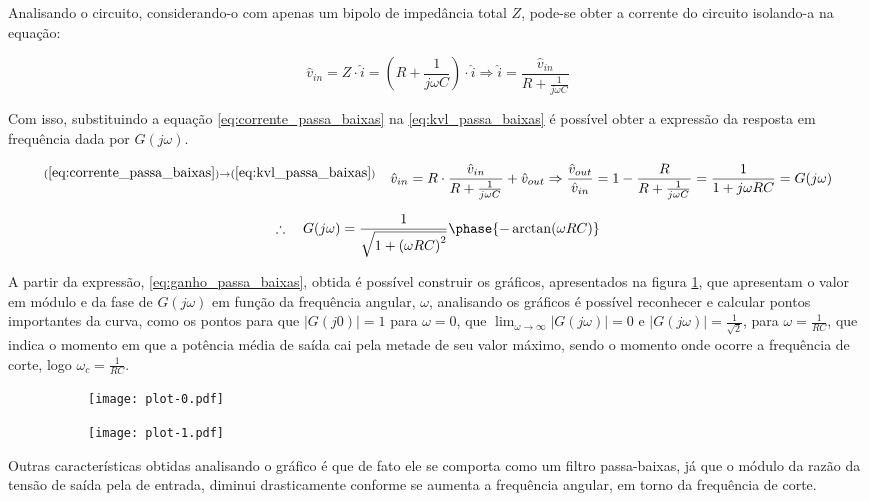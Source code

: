   Analisando o circuito, considerando-o com apenas um bipolo de impedância total $Z$, pode-se obter a corrente do circuito isolando-a na equação:

  \begin{equation}
    \hat{v}_{in} = Z \cdot \hat{i} = \left( R + \frac{1}{j \omega C} \right) \cdot \hat{i} \Rightarrow \hat{i} = \frac{\hat{v}_{in}}{R + \frac{1}{j \omega C}}
    \label{eq:corrente_passa_baixas}
  \end{equation}

  Com isso, substituindo a equação \ref{eq:corrente_passa_baixas} na \ref{eq:kvl_passa_baixas} é possível obter a expressão da resposta em frequência dada por $G(j \omega)$.

  \begin{equation*}
    \sp{(\ref{eq:corrente_passa_baixas}) \rightarrow (\ref{eq:kvl_passa_baixas})}
    \quad \hat{v}_{in} = R \cdot \frac{\hat{v}_{in}}{R + \frac{1}{j \omega C}} + \hat{v}_{out} \Rightarrow \frac{\hat{v}_{out}}{\hat{v}_{in}} = 1 - \frac{R}{R + \frac{1}{j \omega C}} = \frac{1}{1 + j \omega R C} = G(j \omega) 
  \end{equation*}

  \begin{equation}
    \therefore \quad G(j \omega) = \frac{1}{\sqrt{1 + \left(\omega R C\right)^2}} \phase{-\arctan(\omega R C)}
    \label{eq:ganho_passa_baixas}
  \end{equation}

  A partir da expressão, \ref{eq:ganho_passa_baixas}, obtida é possível construir os gráficos, apresentados na figura \ref{fig:grafico_passa_baixas}, que apresentam o valor em módulo e da fase de $G(j\omega)$ em função da frequência angular, $\omega$, analisando os gráficos é possível reconhecer e calcular pontos importantes da curva, como os pontos para que $|G(j0)| = 1$ para $\omega = 0$, que $ \lim_{\omega\to\infty} |G(j\omega)| = 0$ e $|G(j \omega)| = \frac{1}{\sqrt{2}}$, para $\omega = \frac{1}{RC}$, que indica o momento em que a potência média de saída cai pela metade de seu valor máximo, sendo o momento onde ocorre a frequência de corte, logo $\omega_c = \frac{1}{RC}$.

  \begin{figure}[H]
    \caption{Gráficos do circuito passa-baixas, módulo e fase, respectivamente}
    \begin{subfigure}{0.5 \linewidth}
      \texttt{[image: plot-0.pdf]}
    \end{subfigure}%
    \begin{subfigure}{0.5 \linewidth}
      \texttt{[image: plot-1.pdf]}
    \end{subfigure}
    \label{fig:grafico_passa_baixas}
  \end{figure}

  Outras características obtidas analisando o gráfico é que de fato ele se comporta como um filtro passa-baixas, já que o módulo da razão da tensão de saída pela de entrada, diminui drasticamente conforme se aumenta a frequência angular, em torno da frequência de corte.
  